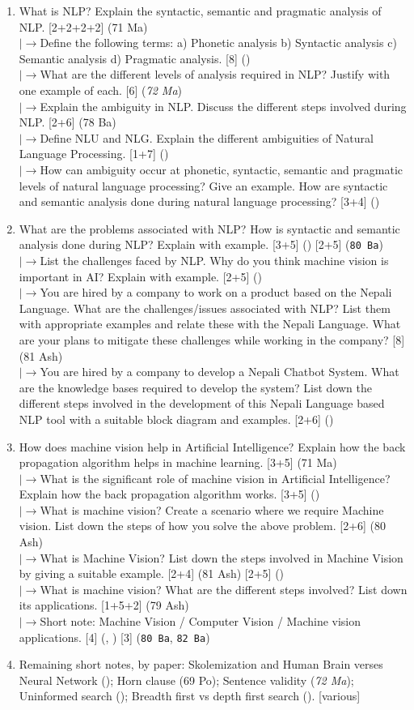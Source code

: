 \documentclass[12pt]{article}
\newcommand{\lb}{\\$\left|\rightarrow\right.$}
\begin{document}
\begin{enumerate}[topsep=0pt, noitemsep]
      \item What is NLP? Explain the syntactic, semantic and pragmatic analysis of NLP. \hfill [2+2+2+2] (71 Ma)
        \lb Define the following terms: a) Phonetic analysis b) Syntactic analysis c) Semantic analysis d) Pragmatic analysis. \hfill [8] ()
        \lb What are the different levels of analysis required in NLP? Justify with one example of each. \hfill [6] (\textit{72 Ma})
        \lb Explain the ambiguity in NLP. Discuss the different steps involved during NLP. \hfill [2+6] (78 Ba)
        \lb Define NLU and NLG. Explain the different ambiguities of Natural Language Processing. \hfill [1+7] ()
        \lb How can ambiguity occur at phonetic, syntactic, semantic and pragmatic levels of natural language processing? Give an example. How are syntactic and semantic analysis done during natural language processing? \hfill [3+4] ()

      \item What are the problems associated with NLP? How is syntactic and semantic analysis done during NLP? Explain with example. \hfill [3+5] () [2+5] (\texttt{80 Ba})
        \lb List the challenges faced by NLP. Why do you think machine vision is important in AI? Explain with example. \hfill [2+5] ()
        \lb You are hired by a company to work on a product based on the Nepali Language. What are the challenges/issues associated with NLP? List them with appropriate examples and relate these with the Nepali Language. What are your plans to mitigate these challenges while working in the company? \hfill [8] (81 Ash)
        \lb You are hired by a company to develop a Nepali Chatbot System. What are the knowledge bases required to develop the system? List down the different steps involved in the development of this Nepali Language based NLP tool with a suitable block diagram and examples. \hfill [2+6] ()

      \item How does machine vision help in Artificial Intelligence? Explain how the back propagation algorithm helps in machine learning. \hfill [3+5] (71 Ma)
        \lb What is the significant role of machine vision in Artificial Intelligence? Explain how the back propagation algorithm works. \hfill [3+5] ()
        \lb What is machine vision? Create a scenario where we require Machine vision. List down the steps of how you solve the above problem. \hfill [2+6] (80 Ash)
        \lb What is Machine Vision? List down the steps involved in Machine Vision by giving a suitable example. \hfill [2+4] (81 Ash) [2+5] ()
        \lb What is machine vision? What are the different steps involved? List down its applications. \hfill [1+5+2] (79 Ash)
        \lb Short note: Machine Vision / Computer Vision / Machine vision applications. \hfill [4] (, ) [3] (\texttt{80 Ba}, \texttt{82 Ba})

      \item Remaining short notes, by paper: Skolemization and Human Brain verses Neural Network (); Horn clause (69 Po); Sentence validity (\textit{72 Ma}); Uninformed search (); Breadth first vs depth first search (). \hfill [various]
    \end{enumerate}
\end{document}

